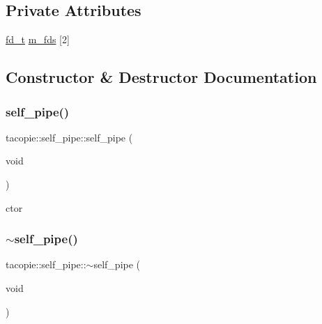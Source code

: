 \subsection*{Private Attributes}
\begin{DoxyCompactItemize}
\item 
\hyperlink{namespacetacopie_acce7ad26b2d30156b1e6fa353f727026}{fd\+\_\+t} \hyperlink{classtacopie_1_1self__pipe_a3e562cfb5ffdd3a8bc6a7c28eca2b7af}{m\+\_\+fds} \mbox{[}2\mbox{]}
\end{DoxyCompactItemize}


\subsection{Constructor \& Destructor Documentation}
\mbox{\label{classtacopie_1_1self__pipe_add8d2c43863d1505e6851789ab5d9b97}} 
\subsubsection{\texorpdfstring{self\+\_\+pipe()}{self\_pipe()}\hspace{0.1cm}{\footnotesize\ttfamily [1/2]}}
{\footnotesize\ttfamily tacopie\+::self\+\_\+pipe\+::self\+\_\+pipe (\begin{DoxyParamCaption}\item[{void}]{ }\end{DoxyParamCaption})}



ctor 

\mbox{\label{classtacopie_1_1self__pipe_a10a6c4b0d67a4a14abea397a05cee54c}} 
\subsubsection{\texorpdfstring{$\sim$self\+\_\+pipe()}{~self\_pipe()}}
{\footnotesize\ttfamily tacopie\+::self\+\_\+pipe\+::$\sim$self\+\_\+pipe (\begin{DoxyParamCaption}\item[{void}]{ }\end{DoxyParamCaption})}



